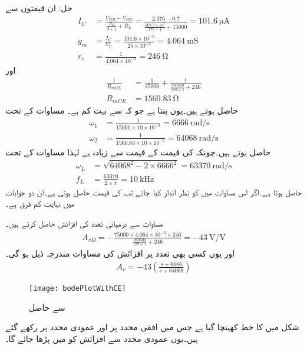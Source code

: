 حل: ان قیمتوں سے
\begin{align*}
I_C&=\frac{V_{BB}-V_{BE}}{\frac{R_B}{\beta+1}+R_E}=\frac{2.376-0.7}{\frac{269.3 \times 10^3}{179+1}+15000}=\SI{101.6}{\micro \ampere}\\
g_m&=\frac{I_C}{V_T}=\frac{101.6 \times 10^{-6}}{25 \times 10^{-3}}=\SI{4.064}{\milli \siemens}\\
r_e&=\frac{1}{4.064 \times 10^{-3}}=\SI{246}{\ohm}
\end{align*}
اور
\begin{align*}
\frac{1}{R_{mCE}}&=\frac{1}{15000}+\frac{1}{\frac{269300}{179+1}+246}\\
R_{mCE}&=\SI{1560.83}{\ohm}
\end{align*}
حاصل ہوتے ہیں۔یوں  بنتا ہے جو کہ  سے بہت کم ہے۔ مساوات   کے تحت
\begin{align*}
\omega_1&=\frac{1}{15000 \times 10 \times 10^{-9}}=\SI[per=frac,fraction=nice]{6666}{\radian \per \second}\\
\omega_2&=\frac{1}{1560.83 \times 10 \times 10^{-9}}=\SI[per=frac,fraction=nice]{64068}{\radian \per \second}
\end{align*}
حاصل ہوتے ہیں۔چونکہ   کی قیمت  کے قیمت سے زیادہ ہے لہٰذا مساوات   کے تحت
\begin{align*}
\omega_L&=\sqrt{64068^2  -  2 \times 6666^2} =\SI[per=frac,fraction=nice]{63370}{\radian \per \second}\\
f_L&=\frac{63370}{2 \times \pi}=\SI{10}{\kilo \hertz}
\end{align*}
حاصل ہوتا ہے۔اگر اس مساوات میں  کو نظر انداز کیا جائے تب  کی قیمت  حاصل ہوتی ہے۔ان دو جوابات میں نہایت کم فرق ہے۔

مساوات   سے درمیانی تعدد کی افزائش حاصل کرتے ہیں۔
\begin{align*}
A_{vD}=-\frac{75000 \times 4.064 \times 10^{-3} \times 246}{\frac{269300}{179+1}+246}=\SI[per=frac,fraction=nice]{-43}{\volt \per \volt}
\end{align*}
اور یوں کسی بھی تعدد پر افزائش کی مساوات مندرجہ ذیل ہو گی۔
\begin{align}\label{مساوات_تعددی_ردعمل_مخارج_کپیسٹر}
A_v=-43 \left(\frac{s+6666}{s+64068} \right )
\end{align}
%
\begin{figure}
\centering
\texttt{[image: bodePlotWithCE]}
\caption{ سے حاصل }
\label{شکل_مخارج_کپیسٹر_سے_حاصل_پست_انقطاعی_تعدد}
\end{figure}
شکل  میں  کا خط کھینچا گیا ہے جس میں افقی محدد پر  اور عمودی محدد پر  رکھے گئے ہیں۔یوں عمودی محدد سے افزائش کو  میں پڑھا جائے گا۔


